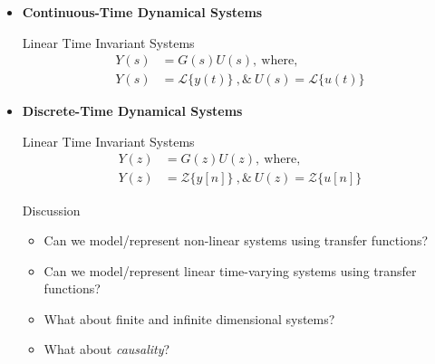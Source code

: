 \documentclass[twoside]{article}
\begin{document}
\begin{itemize}

\item \textbf{Continuous-Time Dynamical Systems}

Linear Time Invariant Systems
%
\begin{align*}
  Y(s) &= G(s) U(s) , \ \mathrm{where}  , \\
  Y(s) &= \mathcal{L}\lbrace y(t) \rbrace \ , \& \   
  U(s) = \mathcal{L}\lbrace u(t) \rbrace
\end{align*}

\vspace{12pt}

\item \textbf{Discrete-Time Dynamical Systems}

Linear Time Invariant Systems
%
\begin{align*}
  Y(z) &= G(z) U(z) , \ \mathrm{where}  , \\
  Y(z) &= \mathcal{Z}\lbrace y[n] \rbrace \ , \& \   
  U(z) = \mathcal{Z}\lbrace u[n] \rbrace
\end{align*}

\vspace{12pt}

Discussion 

\vspace{6pt}

\begin{itemize}
  \item Can we model/represent non-linear systems using transfer
    functions?
  \item Can we model/represent linear time-varying systems using transfer
    functions? 
  \item What about finite and infinite dimensional systems?
  \item What about \textit{causality}?    
\end{itemize}

\vspace{12pt}

\end{itemize}


\end{document}
